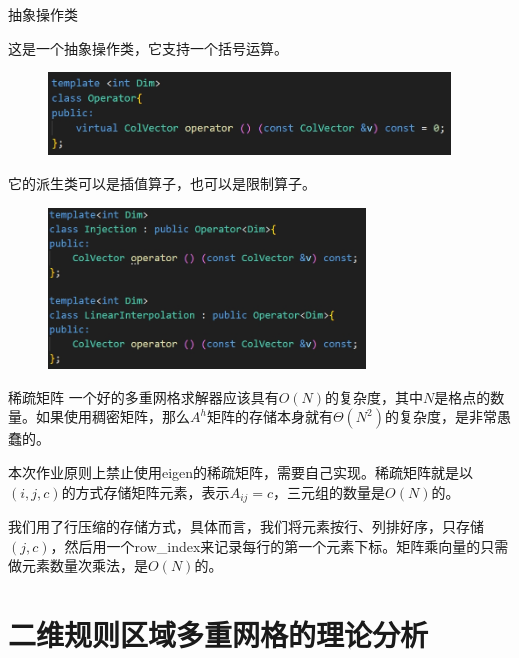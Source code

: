 \documentclass[9pt]{beamer}
\begin{document}
\begin{frame}{抽象操作类}

这是一个抽象操作类，它支持一个括号运算。
\begin{figure}[H]
\centering
\includegraphics[width=0.95\textwidth]{pic/operator.png}
\end{figure}

\pause
它的派生类可以是插值算子，也可以是限制算子。
\begin{figure}[H]
\centering
\includegraphics[width=0.75\textwidth]{pic/suboperator.png}
\end{figure}

\end{frame}

\begin{frame}{稀疏矩阵}
  一个好的多重网格求解器应该具有$O(N)$的复杂度，其中$N$是格点的数量。如果使用稠密矩阵，那么$A^h$矩阵的存储本身就有$\Theta(N^2)$的复杂度，是非常愚蠢的。

  \vspace{1em}
  \pause
  本次作业原则上禁止使用eigen的稀疏矩阵，需要自己实现。稀疏矩阵就是以$(i,j,c)$的方式存储矩阵元素，表示$A_{ij}=c$，三元组的数量是$O(N)$的。

  \vspace{1em}
  \pause
  我们用了行压缩的存储方式，具体而言，我们将元素按行、列排好序，只存储$(j,c)$，然后用一个row\_index来记录每行的第一个元素下标。矩阵乘向量的只需做元素数量次乘法，是$O(N)$的。
\end{frame}

\section{二维规则区域多重网格的理论分析}
\end{document}
